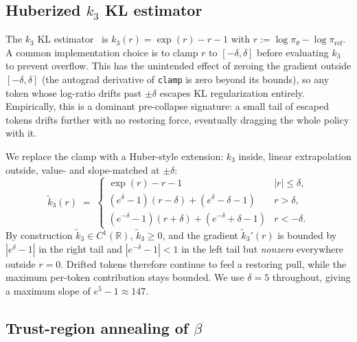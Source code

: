 \documentclass[11pt]{article}
\theoremstyle{definition}
\theoremstyle{remark}
\newcommand{\R}{\mathbb{R}}
\begin{document}
\subsection{Huberized $k_3$ KL estimator}
\label{sec:method-huber}

The $k_3$ KL estimator~\citep{schulman2020kl} is
$k_3(r) = \exp(r) - r - 1$ with
$r := \log \pi_\theta - \log \pi_{\mathrm{ref}}$.  A common
implementation choice is to clamp $r$ to $[-\delta, \delta]$ before
evaluating $k_3$ to prevent overflow.  This has the unintended effect
of zeroing the gradient outside $[-\delta, \delta]$ (the autograd
derivative of \texttt{clamp} is zero beyond its bounds), so any token
whose log-ratio drifts past $\pm\delta$ escapes KL regularization
entirely.  Empirically, this is a dominant pre-collapse signature: a
small tail of escaped tokens drifts further with no restoring force,
eventually dragging the whole policy with it.

We replace the clamp with a Huber-style extension: $k_3$ inside,
linear extrapolation outside, value- and slope-matched at $\pm\delta$:
\begin{equation}
\tilde k_3(r) \;=\;
\begin{cases}
\exp(r) - r - 1 & |r| \le \delta, \\
(e^\delta - 1)(r - \delta) + (e^\delta - \delta - 1) & r > \delta, \\
(e^{-\delta} - 1)(r + \delta) + (e^{-\delta} + \delta - 1) & r < -\delta.
\end{cases}
\label{eq:method-huber-kl}
\end{equation}
By construction $\tilde k_3 \in C^1(\R)$, $\tilde k_3 \ge 0$, and the
gradient $\tilde k_3'(r)$ is bounded by $|e^\delta - 1|$ in the right
tail and $|e^{-\delta} - 1| < 1$ in the left tail but \emph{nonzero}
everywhere outside $r = 0$.  Drifted tokens therefore continue to feel
a restoring pull, while the maximum per-token contribution stays
bounded.  We use $\delta = 5$ throughout, giving a maximum slope of
$e^5 - 1 \approx 147$.

\subsection{Trust-region annealing of $\beta$}
\label{sec:method-anneal}
\end{document}
